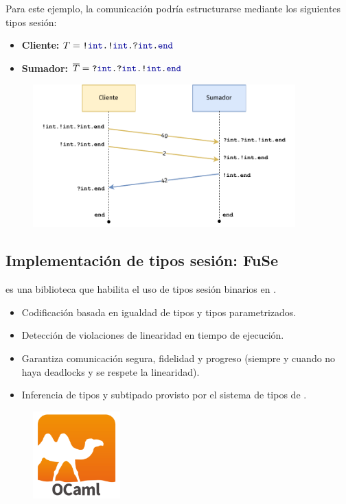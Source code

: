 \begin{frame}{\insertsubsection}
	Para este ejemplo, la comunicación podría estructurarse mediante los siguientes tipos sesión:
	\begin{itemize}
		\item \textbf{Cliente:} $\SessionType = \Out\tint{ \Out\tint{ \In\tint\End } }$
		\item \textbf{Sumador:} $\dual\SessionType = \In\tint{ \In\tint{ \Out\tint\End } }$
	\end{itemize}

	\begin{figure}
		\centering
		\includegraphics[width=0.9\textwidth]{images/sum-diagram-st.pdf}
	\end{figure}
\end{frame}

\subsection{Implementación de tipos sesión: FuSe}

\begin{frame}{\insertsubsection}
	\FuSe {} es una biblioteca que habilita el uso de tipos sesión binarios en
	\OCaml.
	\begin{itemize}
		\item Codificación basada en igualdad de tipos y tipos parametrizados.
		\item Detección de violaciones de linearidad en tiempo de ejecución.
		\item Garantiza comunicación segura, fidelidad y progreso (siempre y cuando no haya deadlocks y se respete la linearidad).
		\item Inferencia de tipos y subtipado provisto por el sistema de tipos de \OCaml.
	\end{itemize}
	\begin{figure}
		\centering
		\includegraphics[width=0.3\textwidth]{images/ocaml-logo.png}
	\end{figure}
\end{frame}

